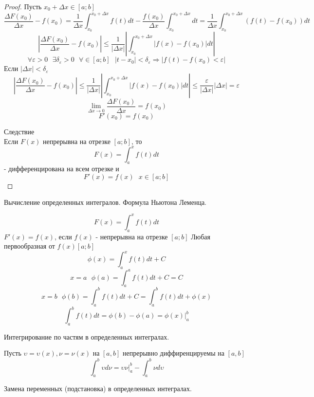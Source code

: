\begin{proof}
  Пусть $x_0 + \Delta x \in [a; b]$
  \[\frac{\Delta F(x_0)}{\Delta x} - f(x_0) = \frac{1}{\Delta x}
    \int^{x_0 + \Delta x}_{x_0} f(t)dt - \frac{f(x_0)}{\Delta x}
    \int^{x_0 + \Delta x}_{x_0} dt = \frac{1}{\Delta x}
    \int^{x_0 + \Delta x}_{x_0} (f(t) - f(x_0))dt\]
  \[\left | \frac{\Delta F(x_0)}{\Delta x} - f(x_0)
    \right | \le \frac{1}{|\Delta x|} \left |
    \int^{x_0 + \Delta x}_{x_0} |f(x) - f(x_0)|dt \right |\]
  \[\forall \varepsilon > 0 ~~~ \exists \delta_\varepsilon > 0
    ~~~ \forall \in [a; b] ~~~ |t - x_0| < \delta_\varepsilon \Rightarrow
    |f(t) - f(x_0) < \varepsilon|\]
  Если $|\Delta x| < \delta_\varepsilon$
  \[\left | \frac{\Delta F(x_0)}{\Delta x} - f(x_0) \right | \le
    \frac{1}{|\Delta x|} \left | \int^{x_0 + \Delta x}_{x_0} |f(x) -
    f(x_0)|dt \right | \le \frac{\varepsilon}{|\Delta x|} |\Delta x| =
    \varepsilon\]
  \[\lim_{\Delta x \to 0} \frac{\Delta F(x_0)}{\Delta x} = f(x_0)\]
  \[F'(x_0) = f(x_0)\]

  Следствие\\
  Если $F(x)$ непрерывна на отрезке $[a; b]$, то
  \[F(x) = \int^x_a f(t)dt\] - дифференцирована на всем отрезке и
  \[F'(x) = f(x) ~~~ x \in [a; b]\]
\end{proof}

\begin{title}[\Large]
  Вычисление определенных интегралов. Формула Ньютона Леменца.
\end{title}

\[F(x) = \int^x_a f(t)dt\]
$F'(x) = f(x)$, если $f(x)$ - непрерывна на отрезке $[a; b]$ Любая первообразная
от $f(x) [a; b]$
\[\phi (x) = \int^x_a f(t)dt + C\]
\[x = a ~~~ \phi (a) = \int^a_a f(t)dt + C = C\]
\[x = b ~~~ \phi (b) = \int^b_a f(t)dt + C = \int^b_a f(t)dt + \phi(x)\]
\[\int^b_a f(t)dt = \phi(b) - \phi(a) = \phi(x)|^b_a\]

\begin{title}[\Large]
  Интегрирование по частям в определенных интегралах.
\end{title}

\begin{theorem}
  Пусть $\upsilon = \upsilon (x), \nu = \nu(x)$ на $[a,b]$ непрерывно
  диффиренцируемы на $[a,b]$
  \[
    \int_a^b \upsilon d\nu = \upsilon \nu |_a^b - \int_a^b \nu d\upsilon
  \]
\end{theorem}

\begin{title}[\Large]
  Замена переменных (подстановка) в определенных интегралах.
\end{title}

